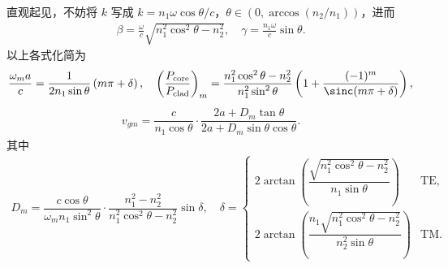 直观起见，不妨将 \(k\) 写成 \(k = n_1 \omega \cos\theta / c\)，\(\theta \in \left( 0, \arccos(n_2/n_1) \right)\)，进而
\begin{align*}
	\beta = \frac{\omega}{c} \sqrt{n_1^2 \cos^2\theta - n_2^2},\quad\gamma = \frac{n_1 \omega}{c} \sin\theta.
\end{align*}
以上各式化简为
\begin{align*}
	\dfrac{\omega_m a}{c} = \dfrac{1}{2 n_1 \sin\theta} \left( m\pi + \delta \right), \quad \left( \dfrac{P_{\text{core}}}{P_{\text{clad}}} \right)_m = \dfrac{n_1^2 \cos^2\theta - n_2^2}{n_1^2 \sin^2\theta} \left( 1 + \dfrac{(-1)^m}{\sinc(m\pi + \delta)} \right),
\end{align*}
\begin{align*}
	v_{gm} = \dfrac{c}{n_1 \cos\theta} \cdot \dfrac{2a + D_m \tan\theta}{2a + D_m \sin\theta \cos\theta}.
\end{align*}
其中
\begin{align*}
	D_m = \dfrac{c \cos\theta}{\omega_m n_1 \sin^2\theta} \cdot \dfrac{n_1^2 - n_2^2}{n_1^2 \cos^2\theta - n_2^2} \sin\delta, \quad \delta =
	\begin{cases}
		2 \arctan\left( \dfrac{\sqrt{n_1^2 \cos^2\theta - n_2^2}}{n_1 \sin\theta} \right)       & \text{TE}, \\
		2 \arctan\left( \dfrac{n_1 \sqrt{n_1^2 \cos^2\theta - n_2^2}}{n_2^2 \sin\theta} \right) & \text{TM}.
	\end{cases}
\end{align*}

